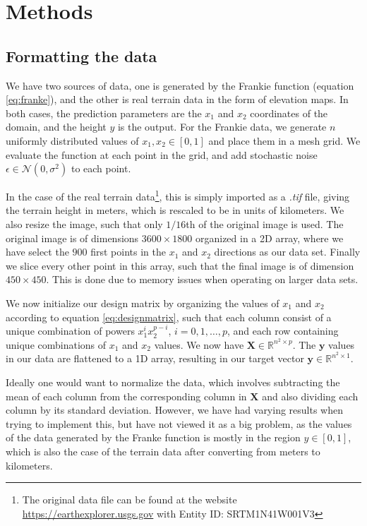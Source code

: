 \section{Methods}\label{sec:Methods}
\subsection{Formatting the data}\label{sec:data_format}
We have two sources of data, one is generated by the Frankie function (equation \ref{eq:franke}), and the other is real terrain data in the form of elevation maps. In both cases, the prediction parameters are the $x_1$ and $x_2$ coordinates of the domain, and the height $y$ is the output. For the Frankie data, we generate $n$ uniformly distributed values of $x_1, x_2 \in [0,1]$ and place them in a mesh grid.  We evaluate the function at each point in the grid, and add stochastic noise $\epsilon \in \mathcal{N}(0, \sigma^2)$ to each point.

In the case of the real terrain data\footnote{The original data file can be found at the website \url{https://earthexplorer.usgs.gov} with Entity ID: SRTM1N41W001V3}, this is simply imported as a \textit{.tif} file, giving the terrain height in meters, which is rescaled to be in units of kilometers. We also resize the image, such that only $1/16$th of the original image is used. The original image is of dimensions $3600 \times 1800$ organized in a 2D array, where we have select the $900$ first points in the $x_1$ and $x_2$ directions as our data set. Finally we slice every other point in this array, such that the final image is of dimension $450 \times 450$. This is done due to memory issues when operating on larger data sets.

We now initialize our design matrix by organizing the values of $x_1$ and $x_2$ according to equation \ref{eq:designmatrix}, such that each column consist of a unique combination of powers $x_1^i x_2^{p-i}$, $i = 0,1,\dots,p$, and each row containing unique combinations of $x_1$ and $x_2$ values. We now have $\boldsymbol{X} \in \mathbb{R}^{n^2 \times p}$. The $\boldsymbol{y}$ values in our data are flattened to a 1D array, resulting in our target vector $\boldsymbol{y} \in \mathbb{R}^{n^2 \times 1}$. 

Ideally one would want to normalize the data, which involves subtracting the mean of each column from the corresponding column in $\boldsymbol{X}$ and also dividing each column by its standard deviation. However, we have had varying results when trying to implement this, but have not viewed it as a big problem, as the values of the data generated by the Franke function is mostly in the region $y \in [0, 1]$, which is also the case of the terrain data after converting from meters to kilometers.

